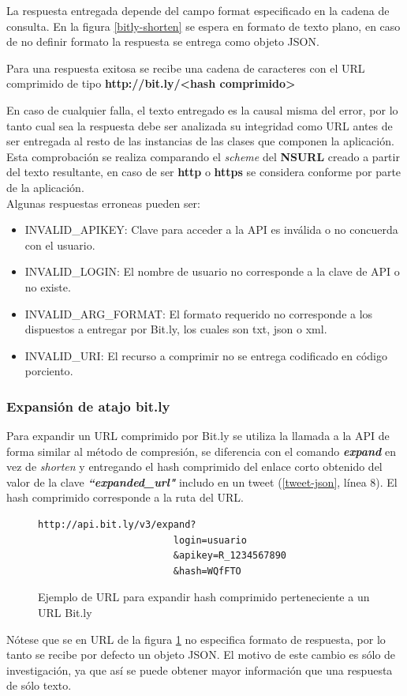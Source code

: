 La respuesta entregada depende del campo format especificado en la cadena de consulta. En la figura \ref{bitly-shorten} se espera en formato de texto plano, en caso de no definir formato la respuesta se entrega como objeto JSON.

Para una respuesta exitosa se recibe una cadena de caracteres con el URL comprimido de tipo 
\textbf{http://bit.ly/\textless hash comprimido\textgreater}

En caso de cualquier falla, el texto entregado es la causal misma del error, por lo tanto cual sea la respuesta debe ser analizada su integridad como URL antes de ser entregada al resto de las instancias de las clases que componen la aplicación. Esta comprobación se realiza comparando el \textit{scheme} del \textbf{NSURL} creado a partir del texto resultante, en caso de ser \textbf{http} o \textbf{https} se considera conforme por parte de la aplicación.\\ 


Algunas respuestas erroneas pueden ser:
\begin{itemize}
\item INVALID\_APIKEY: Clave para acceder a la API es inválida o no concuerda con el usuario. 
\item INVALID\_LOGIN: El nombre de usuario no corresponde a la clave de API o no existe.
\item INVALID\_ARG\_FORMAT: El formato requerido no corresponde a los dispuestos a entregar por Bit.ly, los cuales son txt, json o xml.
\item INVALID\_URI: El recurso a comprimir no se entrega codificado en código porciento\cite{percent-encoding}.
\end{itemize}

		\subsubsection{Expansión de atajo bit.ly}
Para expandir un URL comprimido por Bit.ly se utiliza la llamada a la API de forma similar al método de compresión, se diferencia con el comando \textit{\textbf{expand}} en vez de \textit{shorten} y entregando el hash comprimido del enlace corto obtenido del valor de la clave \textit{\textbf{\textquotedblleft expanded\_url"}} includo en un tweet (\ref{tweet-json}, línea 8). El hash comprimido corresponde a la ruta del URL.

\begin{figure}[H]
	\centering
\begin{lstlisting}
http://api.bit.ly/v3/expand?
						login=usuario
						&apikey=R_1234567890
						&hash=WQfFTO
\end{lstlisting}
	\caption{Ejemplo de URL para expandir hash comprimido perteneciente a un URL Bit.ly}
	\label{bitly-expand}
\end{figure}	
Nótese que se en URL de la figura \ref{bitly-expand} no especifica formato de respuesta, por lo tanto se recibe por defecto un objeto JSON. El motivo de este cambio es sólo de investigación, ya que así se puede obtener mayor información que una respuesta de sólo texto.

